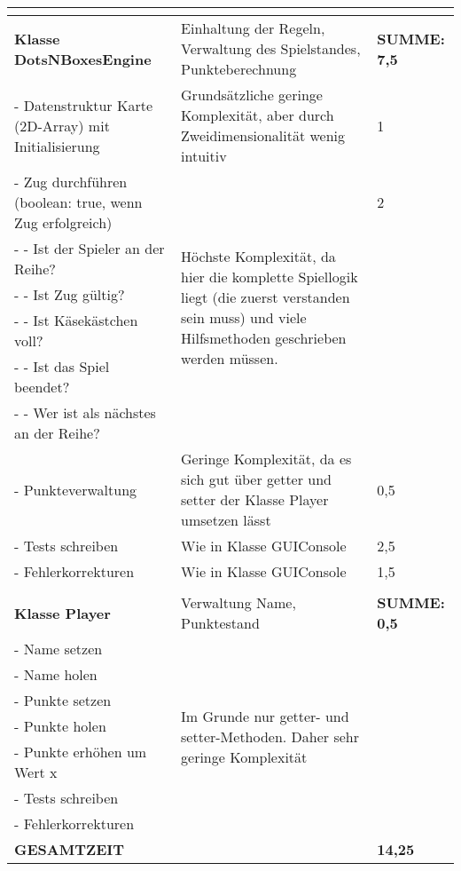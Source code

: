 \documentclass[a4paper,10pt]{article}
\begin{document}
\begin{tabular}{|p{}|p{}|p{}|}
 \hline
 \multicolumn{3}{l}{} \\
 \hline
 \textbf{Klasse DotsNBoxesEngine} & Einhaltung der Regeln, Verwaltung des Spielstandes, Punkteberechnung & \textbf{SUMME: 7,5} \\
 \hline
 \-- Datenstruktur Karte (2D-Array) mit Initialisierung & Grundsätzliche geringe Komplexität, aber durch Zweidimensionalität wenig intuitiv & 1 \\
 \hline
 \-- Zug durchführen (boolean: true, wenn Zug erfolgreich) & \multirow{6}{0.4\textwidth}{Höchste Komplexität, da hier die komplette Spiellogik liegt (die zuerst verstanden sein muss) und viele Hilfsmethoden geschrieben werden müssen.} & 2\\
 \-- \-- Ist der Spieler an der Reihe? & &\\
 \-- \-- Ist Zug gültig? &  &\\
 \-- \-- Ist Käsekästchen voll? &  &\\
 \-- \-- Ist das Spiel beendet? &  &\\
 \-- \-- Wer ist als nächstes an der Reihe? &  &\\
 \hline
 \-- Punkteverwaltung & Geringe Komplexität, da es sich gut über getter und setter der Klasse Player umsetzen lässt & 0,5\\
 \hline
 \-- Tests schreiben & Wie in Klasse GUIConsole &  2,5\\
 \hline
 \-- Fehlerkorrekturen & Wie in Klasse GUIConsole & 1,5 \\
 \hline
  \multicolumn{3}{l}{} \\[0.01cm]
 \hline
 \textbf{Klasse Player} & Verwaltung Name, Punktestand & \textbf{SUMME: 0,5} \\
 \hline
 \-- Name setzen & \multirow{7}{0.4\textwidth}{Im Grunde nur getter- und setter-Methoden. Daher sehr geringe Komplexität} & \\
 \-- Name holen & &\\
 \-- Punkte setzen & &\\
 \-- Punkte holen & &\\
 \-- Punkte erhöhen um Wert x & &\\
 \-- Tests schreiben & &\\
 \-- Fehlerkorrekturen & &\\
 \hline
 \hline
 \textbf{GESAMTZEIT} & &  \textbf{14,25} \\
 \hline
\end{tabular}
\end{document}

